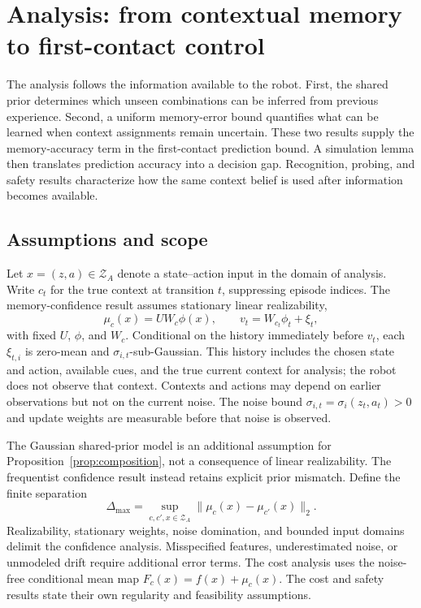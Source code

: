 \section{Analysis: from contextual memory to first-contact control}\label{sec:theory}
The analysis follows the information available to the robot. First, the shared prior determines which unseen combinations can be inferred from previous experience. Second, a uniform memory-error bound quantifies what can be learned when context assignments remain uncertain. These two results supply the memory-accuracy term in the first-contact prediction bound. A simulation lemma then translates prediction accuracy into a decision gap. Recognition, probing, and safety results characterize how the same context belief is used after information becomes available.

\subsection{Assumptions and scope}
Let $x=(z,a)\in\mathcal Z_A$ denote a state--action input in the domain of analysis. Write $c_t$ for the true context at transition $t$, suppressing episode indices. The memory-confidence result assumes stationary linear realizability,
\begin{equation}\label{eq:realizability}
 \mu_c(x)=UW_c\phi(x),\qquad v_t=W_{c_t}\phi_t+\xi_t,
\end{equation}
with fixed $U$, $\phi$, and $W_c$. Conditional on the history immediately before $v_t$, each $\xi_{t,i}$ is zero-mean and $\sigma_{i,t}$-sub-Gaussian. This history includes the chosen state and action, available cues, and the true current context for analysis; the robot does not observe that context. Contexts and actions may depend on earlier observations but not on the current noise. The noise bound $\sigma_{i,t}=\sigma_i(z_t,a_t)>0$ and update weights are measurable before that noise is observed.

The Gaussian shared-prior model is an additional assumption for Proposition~\ref{prop:composition}, not a consequence of linear realizability. The frequentist confidence result instead retains explicit prior mismatch. Define the finite separation
\begin{equation}\label{eq:separation}
 \Delta_{\max}=\sup_{c,c',x\in\mathcal Z_A}
 \|\mu_c(x)-\mu_{c'}(x)\|_2.
\end{equation}
Realizability, stationary weights, noise domination, and bounded input domains delimit the confidence analysis. Misspecified features, underestimated noise, or unmodeled drift require additional error terms. The cost analysis uses the noise-free conditional mean map $F_c(x)=f(x)+\mu_c(x)$. The cost and safety results state their own regularity and feasibility assumptions.

